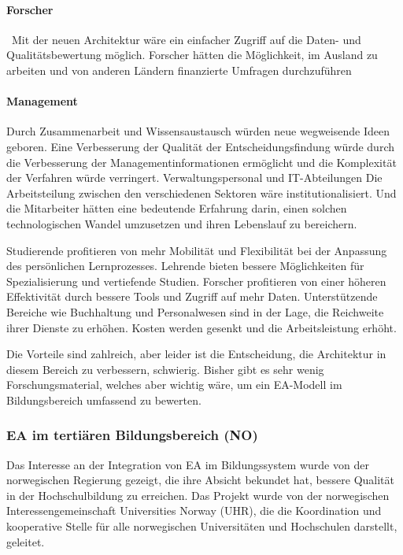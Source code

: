 \documentclass[
	doc,
	a4paper,
	helv
	]{apa6}
\begin{document}
\paragraph{Forscher}
 Mit der neuen Architektur wäre ein einfacher Zugriff auf die Daten- und Qualitätsbewertung möglich. Forscher hätten die Möglichkeit, im Ausland zu arbeiten und von anderen Ländern finanzierte Umfragen durchzuführen
\paragraph{Management}
Durch Zusammenarbeit und Wissensaustausch würden neue wegweisende Ideen geboren. Eine Verbesserung der Qualität der Entscheidungsfindung würde durch die Verbesserung der Managementinformationen ermöglicht und die Komplexität der Verfahren würde verringert.
Verwaltungspersonal und IT-Abteilungen
Die Arbeitsteilung zwischen den verschiedenen Sektoren wäre institutionalisiert. Und die Mitarbeiter hätten eine bedeutende Erfahrung darin, einen solchen technologischen Wandel umzusetzen und ihren Lebenslauf zu bereichern.

Studierende profitieren von mehr Mobilität und Flexibilität bei der Anpassung des persönlichen Lernprozesses. Lehrende bieten bessere Möglichkeiten für Spezialisierung und vertiefende Studien. Forscher profitieren von einer höheren Effektivität durch bessere Tools und Zugriff auf mehr Daten. Unterstützende Bereiche wie Buchhaltung und Personalwesen sind in der Lage, die Reichweite ihrer Dienste zu erhöhen. Kosten werden gesenkt und die Arbeitsleistung erhöht. \autocite{Cole2016}

Die Vorteile sind zahlreich, aber leider ist die Entscheidung, die Architektur in diesem Bereich zu verbessern, schwierig. Bisher gibt es sehr wenig Forschungsmaterial, welches aber wichtig wäre, um ein EA-Modell im Bildungsbereich umfassend zu bewerten.

\subsubsection{EA im tertiären Bildungsbereich (NO)}

Das Interesse an der Integration von EA im Bildungssystem wurde von der norwegischen Regierung gezeigt, die ihre Absicht bekundet hat, bessere Qualität in der Hochschulbildung zu erreichen. Das Projekt  wurde von der norwegischen Interessengemeinschaft Universities Norway (UHR), die die Koordination und kooperative Stelle für alle norwegischen Universitäten und Hochschulen darstellt, geleitet.
\end{document}
